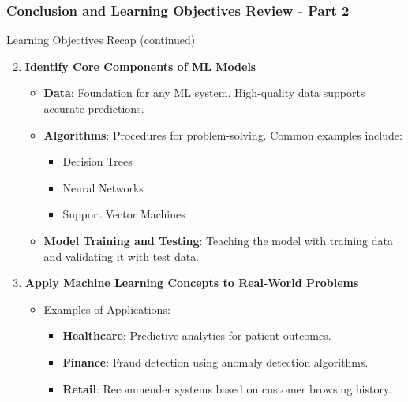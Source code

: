 \documentclass[aspectratio=169]{beamer}
\begin{document}
\begin{frame}[fragile]
    \frametitle{Conclusion and Learning Objectives Review - Part 2}
    \begin{block}{Learning Objectives Recap (continued)}
        \begin{enumerate}
            \setcounter{enumi}{1}
            \item \textbf{Identify Core Components of ML Models}
            \begin{itemize}
                \item \textbf{Data}: Foundation for any ML system. High-quality data supports accurate predictions.
                \item \textbf{Algorithms}: Procedures for problem-solving. Common examples include:
                \begin{itemize}
                    \item Decision Trees
                    \item Neural Networks
                    \item Support Vector Machines
                \end{itemize}
                \item \textbf{Model Training and Testing}: Teaching the model with training data and validating it with test data.
            \end{itemize}
            \item \textbf{Apply Machine Learning Concepts to Real-World Problems}
            \begin{itemize}
                \item Examples of Applications:
                \begin{itemize}
                    \item \textbf{Healthcare}: Predictive analytics for patient outcomes.
                    \item \textbf{Finance}: Fraud detection using anomaly detection algorithms.
                    \item \textbf{Retail}: Recommender systems based on customer browsing history.
                \end{itemize}
            \end{itemize}
        \end{enumerate}
    \end{block}
\end{frame}
\end{document}
